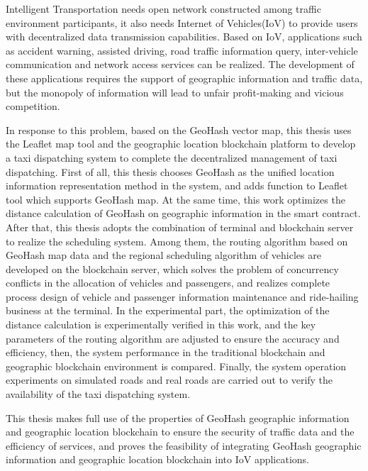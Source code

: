\begin{englishabstract}

Intelligent Transportation needs open network constructed among traffic environment participants, it also needs Internet of Vehicles(IoV) to provide users with decentralized data transmission capabilities. Based on IoV, applications such as accident warning, assisted driving, road traffic information query, inter-vehicle communication and network access services can be realized. The development of these applications requires the support of geographic information and traffic data, but the monopoly of information will lead to unfair profit-making and vicious competition.

In response to this problem, based on the GeoHash vector map, this thesis uses the Leaflet map tool and the geographic location blockchain platform to develop a taxi dispatching system to complete the decentralized management of taxi dispatching. First of all, this thesis chooses GeoHash as the unified location information representation method in the system, and adds function to Leaflet tool which supports GeoHash map. At the same time, this work optimizes the distance calculation of GeoHash on geographic information in the smart contract. After that, this thesis adopts the combination of terminal and blockchain server to realize the scheduling system. Among them, the routing algorithm based on GeoHash map data and the regional scheduling algorithm of vehicles are developed on the blockchain server, which solves the problem of concurrency conflicts in the allocation of vehicles and passengers, and realizes complete process design of vehicle and passenger information maintenance and ride-hailing business at the terminal. In the experimental part, the optimization of the distance calculation is experimentally verified in this work, and the key parameters of the routing algorithm are adjusted to ensure the accuracy and efficiency, then, the system performance in the traditional blockchain and geographic blockchain environment is compared. Finally, the system operation experiments on simulated roads and real roads are carried out to verify the availability of the taxi dispatching system.

This thesis makes full use of the properties of GeoHash geographic information and geographic location blockchain to ensure the security of traffic data and the efficiency of services, and proves the feasibility of integrating GeoHash geographic information and geographic location blockchain into IoV applications.


\end{englishabstract}
